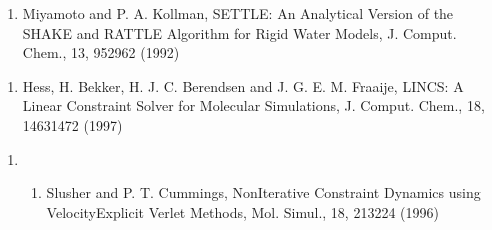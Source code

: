 \documentclass[letterpaper,11pt,english]{sphinxmanual}
\begin{document}
\begin{enumerate}
%
\setcounter{enumi}{18}
\item {} 
Miyamoto and P. A. Kollman, SETTLE: An Analytical Version of the SHAKE and RATTLE Algorithm for Rigid Water Models, J. Comput. Chem., 13, 952\sphinxhyphen{}962 (1992)

\end{enumerate}
\begin{enumerate}
%
\setcounter{enumi}{1}
\item {} 
Hess, H. Bekker, H. J. C. Berendsen and J. G. E. M. Fraaije, LINCS: A Linear Constraint Solver for Molecular Simulations, J. Comput. Chem., 18, 1463\sphinxhyphen{}1472 (1997)

\end{enumerate}
\begin{enumerate}
%
\setcounter{enumi}{9}
\item {} \begin{enumerate}
%
\setcounter{enumii}{19}
\item {} 
Slusher and P. T. Cummings, Non\sphinxhyphen{}Iterative Constraint Dynamics using Velocity\sphinxhyphen{}Explicit Verlet Methods, Mol. Simul., 18, 213\sphinxhyphen{}224 (1996)

\end{enumerate}

\end{enumerate}
\end{document}
